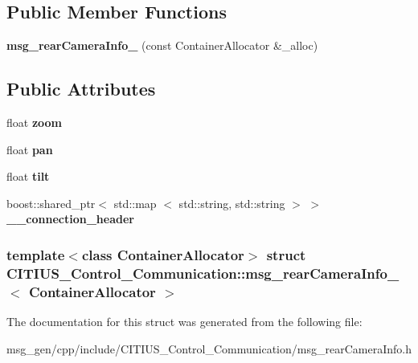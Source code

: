 \subsection*{\-Public \-Member \-Functions}
\begin{DoxyCompactItemize}
\item 
\hypertarget{struct_c_i_t_i_u_s___control___communication_1_1msg__rear_camera_info___a73b1430a7077bd02927bd800557118fd}{{\bfseries msg\-\_\-rear\-Camera\-Info\-\_\-} (const \-Container\-Allocator \&\-\_\-alloc)}\label{struct_c_i_t_i_u_s___control___communication_1_1msg__rear_camera_info___a73b1430a7077bd02927bd800557118fd}

\end{DoxyCompactItemize}
\subsection*{\-Public \-Attributes}
\begin{DoxyCompactItemize}
\item 
\hypertarget{struct_c_i_t_i_u_s___control___communication_1_1msg__rear_camera_info___ad84414b0d7cefaaef570ec494dbaba0f}{float {\bfseries zoom}}\label{struct_c_i_t_i_u_s___control___communication_1_1msg__rear_camera_info___ad84414b0d7cefaaef570ec494dbaba0f}

\item 
\hypertarget{struct_c_i_t_i_u_s___control___communication_1_1msg__rear_camera_info___a30f11d5db758378e84fafb6c37076b48}{float {\bfseries pan}}\label{struct_c_i_t_i_u_s___control___communication_1_1msg__rear_camera_info___a30f11d5db758378e84fafb6c37076b48}

\item 
\hypertarget{struct_c_i_t_i_u_s___control___communication_1_1msg__rear_camera_info___afaaff92e6d76b5bc9c2534c1c2099db4}{float {\bfseries tilt}}\label{struct_c_i_t_i_u_s___control___communication_1_1msg__rear_camera_info___afaaff92e6d76b5bc9c2534c1c2099db4}

\item 
\hypertarget{struct_c_i_t_i_u_s___control___communication_1_1msg__rear_camera_info___a9325b3e33976d87576d56e8cd151b99a}{boost\-::shared\-\_\-ptr$<$ std\-::map\*
$<$ std\-::string, std\-::string $>$ $>$ {\bfseries \-\_\-\-\_\-connection\-\_\-header}}\label{struct_c_i_t_i_u_s___control___communication_1_1msg__rear_camera_info___a9325b3e33976d87576d56e8cd151b99a}

\end{DoxyCompactItemize}
\subsubsection*{template$<$class Container\-Allocator$>$ struct C\-I\-T\-I\-U\-S\-\_\-\-Control\-\_\-\-Communication\-::msg\-\_\-rear\-Camera\-Info\-\_\-$<$ Container\-Allocator $>$}



\-The documentation for this struct was generated from the following file\-:\begin{DoxyCompactItemize}
\item 
msg\-\_\-gen/cpp/include/\-C\-I\-T\-I\-U\-S\-\_\-\-Control\-\_\-\-Communication/msg\-\_\-rear\-Camera\-Info.\-h\end{DoxyCompactItemize}
